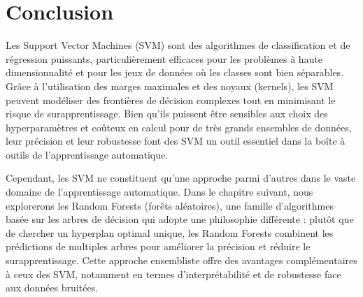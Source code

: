 \section*{Conclusion}
Les Support Vector Machines (SVM) sont des algorithmes de classification et de régression puissants, particulièrement efficaces pour les problèmes à haute dimensionnalité et pour les jeux de données où les classes sont bien séparables. Grâce à l'utilisation des marges maximales et des noyaux (kernels), les SVM peuvent modéliser des frontières de décision complexes tout en minimisant le risque de surapprentissage. Bien qu'ils puissent être sensibles aux choix des hyperparamètres et coûteux en calcul pour de très grands ensembles de données, leur précision et leur robustesse font des SVM un outil essentiel dans la boîte à outils de l'apprentissage automatique.

Cependant, les SVM ne constituent qu'une approche parmi d'autres dans le vaste domaine de l'apprentissage automatique. Dans le chapitre suivant, nous explorerons les Random Forests (forêts aléatoires), une famille d'algorithmes basée sur les arbres de décision qui adopte une philosophie différente : plutôt que de chercher un hyperplan optimal unique, les Random Forests combinent les prédictions de multiples arbres pour améliorer la précision et réduire le surapprentissage. Cette approche ensembliste offre des avantages complémentaires à ceux des SVM, notamment en termes d'interprétabilité et de robustesse face aux données bruitées.



